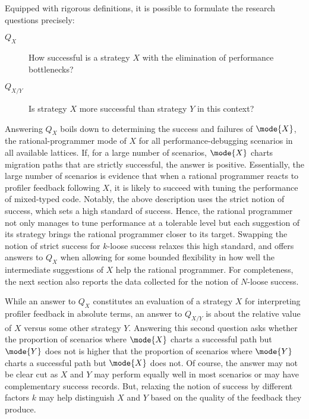 
Equipped with rigorous definitions, it is possible to formulate the research
questions precisely:
\begin{description}

\item[$Q_X$] How successful is a strategy $X$ with the elimination of
  performance bottlenecks?

\item[$Q_{X/Y}$] Is strategy $X$ more successful than strategy $Y$ in this
  context?
  
\end{description}

Answering $Q_X$ boils down to determining the success and failures of
$\mode{X}$, the rational-programmer mode of $X$ for all performance-debugging
scenarios in all available lattices. If, for a large number of scenarios,
$\mode{X}$ charts migration paths that are strictly successful, the answer is
positive. Essentially, the large number of scenarios is evidence that when a
rational programmer reacts to profiler feedback following $X$, it is likely to
succeed with tuning the performance of mixed-typed code. Notably, the above
description uses the strict notion of success, which sets a high standard of
success. Hence, the rational programmer not only manages to tune performance at
a tolerable level but each suggestion of its strategy brings the rational
programmer closer to its target. Swapping the notion of strict success for
$k$-loose success relaxes this high standard, and offers answers to $Q_X$ when
allowing for some bounded flexibility in how well the intermediate suggestions
of $X$ help the rational programmer. For completeness, the next section also
reports the data collected for the notion of $N$-loose success.

While an answer to $Q_X$ constitutes an evaluation of a strategy $X$ for
interpreting profiler feedback in absolute terms, an answer to $Q_{X/Y}$ is
about the relative value of $X$ versus some other strategy
$Y$. Answering this second question asks whether the proportion of scenarios
where $\mode{X}$ charts a successful path but $\mode{Y}$ does not is higher that
the proportion of scenarios where $\mode{Y}$ charts a successful path but
$\mode{X}$ does not. Of course, the answer may not be clear cut as $X$ and $Y$
may perform equally well in most scenarios or may have complementary success
records. But, relaxing the notion of success by different factors $k$ may
help distinguish $X$ and $Y$ based on the quality of the feedback they produce.

